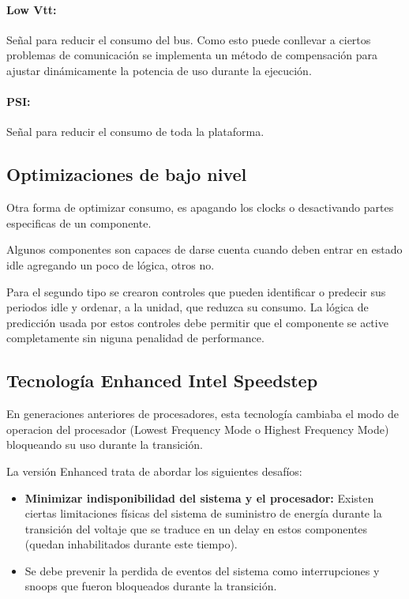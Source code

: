 \paragraph{Low Vtt:} Señal para reducir el consumo del bus. Como esto puede conllevar a ciertos problemas de comunicación se implementa un método de compensación para ajustar dinámicamente la potencia de uso durante la ejecución.

\paragraph{PSI:} Señal para reducir el consumo de toda la plataforma.

\subsection{Optimizaciones de bajo nivel}
Otra forma de optimizar consumo, es apagando los clocks o desactivando partes especificas de un componente.

Algunos componentes son capaces de darse cuenta cuando deben entrar en estado idle agregando un poco de lógica, otros no. 

Para el segundo tipo se crearon controles que pueden identificar o predecir sus periodos idle y ordenar, a la unidad, que reduzca su consumo. La lógica de predicción usada por estos controles debe permitir que el componente se active completamente sin niguna penalidad de performance.

\subsection{Tecnología Enhanced Intel Speedstep}
En generaciones anteriores de procesadores, esta  tecnología cambiaba el modo de operacion del procesador (Lowest Frequency Mode o Highest Frequency Mode) bloqueando su uso durante la transición.

La versión Enhanced trata de abordar los siguientes desafíos:
\begin{itemize}
	\item \textbf{Minimizar indisponibilidad del sistema y el procesador:}  Existen ciertas limitaciones físicas del sistema de suministro de energía durante la transición del voltaje que se traduce en un delay en estos componentes (quedan inhabilitados durante este tiempo).
	\item Se debe prevenir la perdida de eventos del sistema como interrupciones y snoops que fueron bloqueados durante la transición.
\end{itemize}

